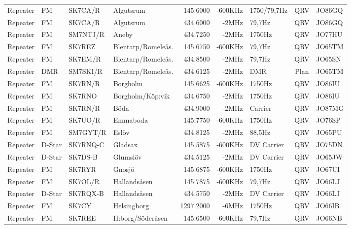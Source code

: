 \begin{landscape}
\begin{longtable}{llllrrlcl}
Repeater & FM     & SK7CA/R  & Algutsrum           & 145.6000  & -600KHz & 1750/79,7Hz  & QRV  & JO86GQ \\
Repeater & FM     & SK7CA/R  & Algutsrum           & 434.6000  & -2MHz   & 79,7Hz       & QRV  & JO86GQ \\
Repeater & FM     & SM7NTJ/R & Aneby               & 434.7250  & -2MHz   & 1750Hz       & QRV  & JO77HU \\
Repeater & FM     & SK7REZ   & Blentarp/Romeleås.  & 145.6750  & -600KHz & 79,7Hz       & QRV  & JO65TM \\
Repeater & FM     & SK7EM/R  & Blentarp/Romeleås.  & 434.8500  & -2MHz   & 79,7Hz       & QRV  & JO65SN \\
Repeater & DMR    & SM7SKI/R & Blentarp/Romeleås.  & 434.6125  & -2MHz   & DMR          & Plan & JO65TM \\
Repeater & FM     & SK7RN/R  & Borgholm            & 145.6625  & -600KHz & 1750Hz       & QRV  & JO86IU \\
Repeater & FM     & SK7RNO   & Borgholm/Köp:vik    & 434.6750  & -2MHz   & 1750Hz       & QRV  & JO86IU \\
Repeater & FM     & SK7RN/R  & Böda                & 434.9000  & -2MHz   & Carrier      & QRV  & JO87MG \\
Repeater & FM     & SK7UO/R  & Emmaboda            & 145.7750  & -600KHz & 1750Hz       & QRV  & JO76SP \\
Repeater & FM     & SM7GYT/R & Eslöv               & 434.8125  & -2MHz   & 88,5Hz       & QRV  & JO65PU \\
Repeater & D-Star & SK7RNQ-C & Gladsax             & 145.5875  & -600KHz & DV Carrier   & QRV  & JO75DN \\
Repeater & D-Star & SK7DS-B  & Glumslöv            & 434.5125  & -2MHz   & DV Carrier   & QRV  & JO65JW \\
Repeater & FM     & SK7RYR   & Gnosjö              & 145.6875  & -600KHz & 1750Hz       & QRV  & JO67UI \\
Repeater & FM     & SK7OL/R  & Hallandsåsen        & 145.7875  & -600KHz & 79,7Hz       & QRV  & JO66LJ \\
Repeater & D-Star & SK7RQX-B & Hallandsåsen        & 434.5750  & -2MHz   & DV Carrier   & QRV  & JO66LJ \\
Repeater & FM     & SK7CY    & Helsingborg         & 1297.2000 & -6MHz   & 1750Hz       & QRV  & JO66IB \\
Repeater & FM     & SK7REE   & H:borg/Söderåsen    & 145.6500  & -600KHz & 79,7Hz       & QRV  & JO66NB \\

\end{longtable}
\end{landscape}
